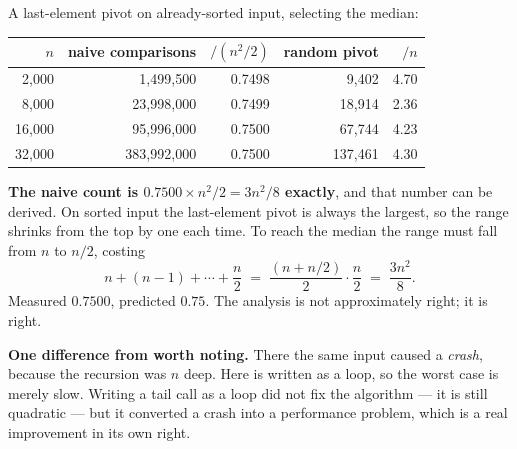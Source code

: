 \begin{worked}
A last-element pivot on already-sorted input, selecting the median:

\begin{center}
\begin{tabular}{@{}rrrrr@{}}
\toprule
\rowcolor{primary!15}
$n$ & naive comparisons & $/(n^{2}/2)$ & random pivot & $/n$ \\
\midrule
 2{,}000 &      1{,}499{,}500 & 0.7498 &   9{,}402 & 4.70 \\
 8{,}000 &     23{,}998{,}000 & 0.7499 &  18{,}914 & 2.36 \\
16{,}000 &     95{,}996{,}000 & 0.7500 &  67{,}744 & 4.23 \\
32{,}000 &    383{,}992{,}000 & 0.7500 & 137{,}461 & 4.30 \\
\bottomrule
\end{tabular}
\end{center}

\smallskip
\textbf{The naive count is $0.7500 \times n^{2}/2 = 3n^{2}/8$ exactly}, and
that number can be derived. On sorted input the last-element pivot is always
the largest, so the range shrinks from the top by one each time. To reach the
median the range must fall from $n$ to $n/2$, costing
\[ n + (n-1) + \cdots + \frac{n}{2} \;=\; \frac{(n + n/2)}{2}\cdot\frac{n}{2}
   \;=\; \frac{3n^{2}}{8}. \]
Measured $0.7500$, predicted $0.75$. The analysis is not approximately right;
it is right.

\smallskip
\textbf{One difference from  worth noting.} There the same
input caused a \emph{crash}, because the recursion was $n$ deep. Here
 is written as a loop, so the worst case is merely slow.
Writing a tail call as a loop did not fix the algorithm --- it is still
quadratic --- but it converted a crash into a performance problem, which is a
real improvement in its own right.
\end{worked}

